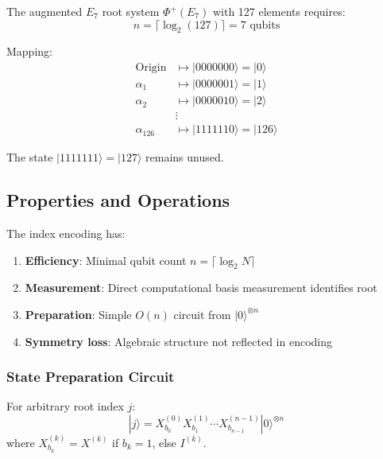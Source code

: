 \begin{theorem}
\label{thm:e7_index_encoding}
The augmented $E_7$ root system $\Phi^+(E_7)$ with 127 elements requires:
\begin{equation}
n = \lceil \log_2(127) \rceil = 7 \text{ qubits}
\end{equation}

Mapping:
\begin{align}
\text{Origin} &\mapsto |0000000\rangle = |0\rangle \\
\alpha_1 &\mapsto |0000001\rangle = |1\rangle \\
\alpha_2 &\mapsto |0000010\rangle = |2\rangle \\
&\vdots \\
\alpha_{126} &\mapsto |1111110\rangle = |126\rangle
\end{align}

The state $|1111111\rangle = |127\rangle$ remains unused.
\end{theorem}

\subsection{Properties and Operations}

\begin{proposition}
\label{prop:index_encoding_properties}
The index encoding has:
\begin{enumerate}
    \item \textbf{Efficiency}: Minimal qubit count $n = \lceil \log_2 N \rceil$
    \item \textbf{Measurement}: Direct computational basis measurement identifies root
    \item \textbf{Preparation}: Simple $O(n)$ circuit from $|0\rangle^{\otimes n}$
    \item \textbf{Symmetry loss}: Algebraic structure not reflected in encoding
\end{enumerate}
\end{proposition}

\subsubsection{State Preparation Circuit}

For arbitrary root index $j$:
\begin{equation}
|j\rangle = X_{b_0}^{(0)} X_{b_1}^{(1)} \cdots X_{b_{n-1}}^{(n-1)} |0\rangle^{\otimes n}
\end{equation}
where $X_{b_k}^{(k)} = X^{(k)}$ if $b_k = 1$, else $I^{(k)}$.

